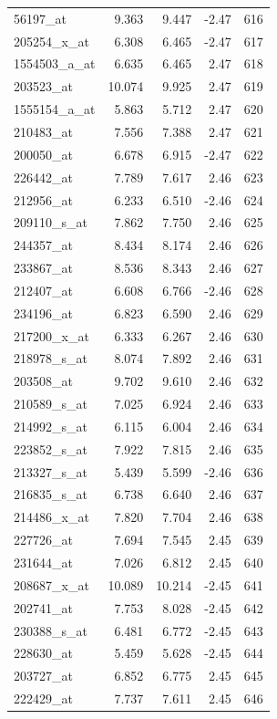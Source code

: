 \begin{footnotesize}
\begin{longtable}{lrrrr}
56197\_at & 9.363 & 9.447 & -2.47 & 616 \\
205254\_x\_at & 6.308 & 6.465 & -2.47 & 617 \\
1554503\_a\_at & 6.635 & 6.465 & 2.47 & 618 \\
203523\_at & 10.074 & 9.925 & 2.47 & 619 \\
1555154\_a\_at & 5.863 & 5.712 & 2.47 & 620 \\
210483\_at & 7.556 & 7.388 & 2.47 & 621 \\
200050\_at & 6.678 & 6.915 & -2.47 & 622 \\
226442\_at & 7.789 & 7.617 & 2.46 & 623 \\
212956\_at & 6.233 & 6.510 & -2.46 & 624 \\
209110\_s\_at & 7.862 & 7.750 & 2.46 & 625 \\
244357\_at & 8.434 & 8.174 & 2.46 & 626 \\
233867\_at & 8.536 & 8.343 & 2.46 & 627 \\
212407\_at & 6.608 & 6.766 & -2.46 & 628 \\
234196\_at & 6.823 & 6.590 & 2.46 & 629 \\
217200\_x\_at & 6.333 & 6.267 & 2.46 & 630 \\
218978\_s\_at & 8.074 & 7.892 & 2.46 & 631 \\
203508\_at & 9.702 & 9.610 & 2.46 & 632 \\
210589\_s\_at & 7.025 & 6.924 & 2.46 & 633 \\
214992\_s\_at & 6.115 & 6.004 & 2.46 & 634 \\
223852\_s\_at & 7.922 & 7.815 & 2.46 & 635 \\
213327\_s\_at & 5.439 & 5.599 & -2.46 & 636 \\
216835\_s\_at & 6.738 & 6.640 & 2.46 & 637 \\
214486\_x\_at & 7.820 & 7.704 & 2.46 & 638 \\
227726\_at & 7.694 & 7.545 & 2.45 & 639 \\
231644\_at & 7.026 & 6.812 & 2.45 & 640 \\
208687\_x\_at & 10.089 & 10.214 & -2.45 & 641 \\
202741\_at & 7.753 & 8.028 & -2.45 & 642 \\
230388\_s\_at & 6.481 & 6.772 & -2.45 & 643 \\
228630\_at & 5.459 & 5.628 & -2.45 & 644 \\
203727\_at & 6.852 & 6.775 & 2.45 & 645 \\
222429\_at & 7.737 & 7.611 & 2.45 & 646 \\

\end{longtable}
\end{footnotesize}

